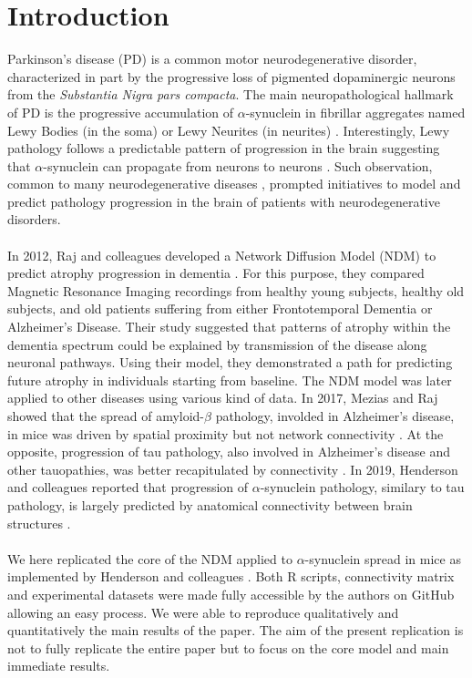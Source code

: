 \section{Introduction}

Parkinson's disease (PD) is a common motor neurodegenerative disorder, characterized in part by the progressive loss of pigmented dopaminergic neurons from the \textit{Substantia Nigra pars compacta}. The main neuropathological hallmark of PD is the progressive accumulation of $\alpha$-synuclein in fibrillar aggregates named Lewy Bodies (in the soma) or Lewy Neurites (in neurites) \cite{Dehay_2015}. Interestingly, Lewy pathology follows a predictable pattern of progression in the brain suggesting that $\alpha$-synuclein can propagate from neurons to neurons \cite{Braak_2003}. Such observation, common to many neurodegenerative diseases \cite{Jucker_2018}, prompted initiatives to model and predict pathology progression in the brain of patients with neurodegenerative disorders. \\
\\
In 2012, Raj and colleagues developed a Network Diffusion Model (NDM) to predict atrophy progression in dementia \cite{Raj_2012}. For this purpose, they compared Magnetic Resonance Imaging recordings from healthy young subjects, healthy old subjects, and old patients suffering from either Frontotemporal Dementia or Alzheimer's Disease. Their study suggested that patterns of atrophy within the dementia spectrum could be explained by transmission of the disease along neuronal pathways. Using their model, they demonstrated a path for predicting future atrophy in individuals starting from baseline. The NDM model was later applied to other diseases using various kind of data. In 2017, Mezias and Raj showed that the spread of amyloid-$\beta$ pathology, involded in Alzheimer's disease, in mice was driven by spatial proximity but not network connectivity \cite{Mezias_2017_abeta}. At the opposite, progression of tau pathology, also involved in Alzheimer's disease and other tauopathies, was better recapitulated by connectivity \cite{Mezias_2017_tau}. In 2019, Henderson and colleagues reported that progression of $\alpha$-synuclein pathology, similary to tau pathology, is largely predicted by anatomical connectivity between brain structures \cite{Henderson_2019}. \\
\\
We here replicated the  core of the NDM applied to $\alpha$-synuclein spread in mice as implemented by Henderson and colleagues \cite{Henderson_2019}. Both R scripts, connectivity matrix and experimental datasets were made fully accessible by the authors on GitHub allowing an easy process. We were able to reproduce qualitatively and quantitatively the main results of the paper. The aim of the present replication is not to fully replicate the entire paper but to focus on the core model and main immediate results.


